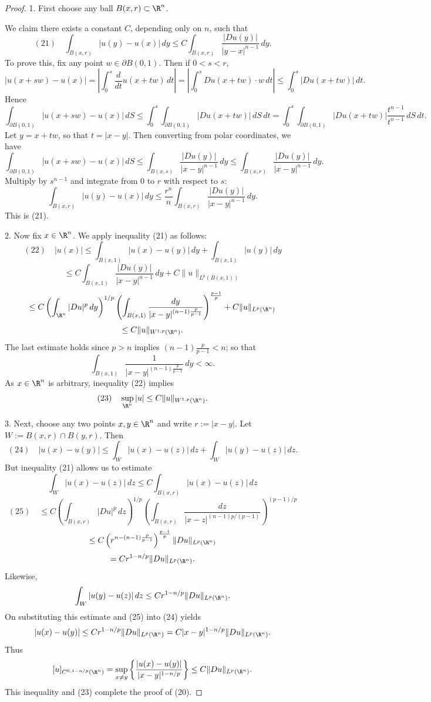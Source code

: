 \begin{proof}
1. First choose any ball $B(x,r) \subset \R^n$.

We claim there exists a constant $C$, depending only on $n$, such that
$$(21) \quad \int_{B(x,r)} |u(y) - u(x)|\,dy \le C \int_{B(x,r)} \frac{|Du(y)|}{|y-x|^{n-1}}\,dy.$$
To prove this, fix any point $w \in \partial B(0, 1)$. Then if $0 < s < r$,
$$|u(x + sw) - u(x)| = \left|\int_0^s \frac{d}{dt} u(x + tw)\,dt\right| = \left|\int_0^s Du(x + tw) \cdot w\,dt\right| \le \int_0^s |Du(x + tw)|\,dt.$$
Hence
$$\int_{\partial B(0,1)} |u(x + sw) - u(x)|\,dS \le \int_0^s \int_{\partial B(0,1)} |Du(x + tw)|\,dS\,dt = \int_0^s \int_{\partial B(0,1)} |Du(x + tw)| \frac{t^{n-1}}{t^{n-1}}\,dS\,dt.$$
Let $y = x + tw$, so that $t = |x - y|$. Then converting from polar coordinates, we have
$$\int_{\partial B(0,1)} |u(x + sw) - u(x)|\,dS \le \int_{B(x,s)} \frac{|Du(y)|}{|x - y|^{n-1}}\,dy \le \int_{B(x,r)} \frac{|Du(y)|}{|x - y|^{n-1}}\,dy.$$
Multiply by $s^{n-1}$ and integrate from 0 to $r$ with respect to $s$:
$$\int_{B(x,r)} |u(y) - u(x)|\,dy \le \frac{r^n}{n} \int_{B(x,r)} \frac{|Du(y)|}{|x - y|^{n-1}}\,dy.$$
This is (21).

2. Now fix $x \in \R^n$. We apply inequality (21) as follows:
$$(22) \quad |u(x)| \le \int_{B(x,1)} |u(x) - u(y)|\,dy + \int_{B(x,1)} |u(y)|\,dy$$
$$\le C \int_{B(x,1)} \frac{|Du(y)|}{|x - y|^{n-1}}\,dy + C\|u\|_{L^p(B(x,1))}$$
$$\le C \left(\int_{\R^n} |Du|^p\,dy\right)^{1/p} \left(\int_{B(x,1)} \frac{dy}{|x - y|^{(n-1)\frac{p}{p-1}}}\right)^{\frac{p-1}{p}} + C\|u\|_{L^p(\R^n)}$$
$$\le C\|u\|_{W^{1,p}(\R^n)}.$$
The last estimate holds since $p > n$ implies $(n-1)\frac{p}{p-1} < n$; so that
$$\int_{B(x,1)} \frac{1}{|x - y|^{(n-1)\frac{p}{p-1}}}\,dy < \infty.$$
As $x \in \R^n$ is arbitrary, inequality (22) implies
$$(23) \quad \sup_{\R^n} |u| \le C\|u\|_{W^{1,p}(\R^n)}.$$

3. Next, choose any two points $x, y \in \R^n$ and write $r := |x - y|$. Let $W := B(x,r) \cap B(y,r)$. Then
$$(24) \quad |u(x) - u(y)| \le \int_W |u(x) - u(z)|\,dz + \int_W |u(y) - u(z)|\,dz.$$
But inequality (21) allows us to estimate
$$\int_W |u(x) - u(z)|\,dz \le C \int_{B(x,r)} |u(x) - u(z)|\,dz$$
$$(25) \quad \le C \left( \int_{B(x,r)} |Du|^p\,dz \right)^{1/p} \left( \int_{B(x,r)} \frac{dz}{|x-z|^{(n-1)p/(p-1)}} \right)^{(p-1)/p}$$
$$\le C \left( r^{n-(n-1)\frac{p}{p-1}} \right)^{\frac{p-1}{p}} \|Du\|_{L^p(\R^n)}$$
$$= Cr^{1-n/p} \|Du\|_{L^p(\R^n)}.$$
Likewise,
$$\int_W |u(y) - u(z)|\,dz \le Cr^{1-n/p} \|Du\|_{L^p(\R^n)}.$$
On substituting this estimate and (25) into (24) yields
$$|u(x) - u(y)| \le Cr^{1-n/p}\|Du\|_{L^p(\R^n)} = C|x-y|^{1-n/p}\|Du\|_{L^p(\R^n)}.$$
Thus
$$[u]_{C^{0,1-n/p}(\R^n)} = \sup_{x \ne y} \left\{ \frac{|u(x) - u(y)|}{|x-y|^{1-n/p}} \right\} \le C\|Du\|_{L^p(\R^n)}.$$
This inequality and (23) complete the proof of (20).
\end{proof}

